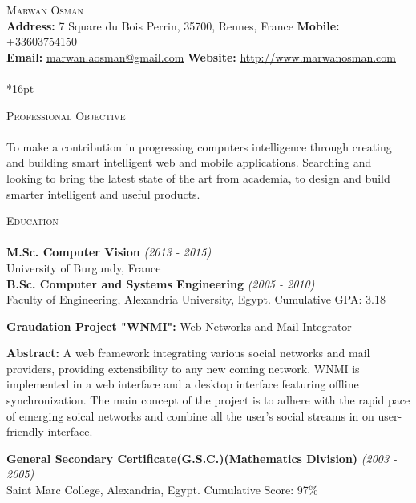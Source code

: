 \documentclass[letterpaper,12pt]{article}
\author{Marwan Osman}
\newcommand{\lineunder}{\vspace*{-8pt} \\ \hspace*{-8pt} \hrulefill \\}
\newcommand{\interval}[1]{\textit{(#1)} }
\newcommand{\header}[1]{{\hspace*{0pt}\vspace*{6pt} \textsc{#1}} \vspace*{-6pt} \lineunder}
\newcommand{\education}[3]{{\textbf{#1} \interval{#2}\\{#3}\\ }}
\newcommand{\objective}[1]{{#1\\\vspace*{8pt}}}
\newcommand{\contact}[3]{\vspace*{-8pt} {\LARGE \scshape {#1}}\\ #2 \lineunder #3 \vspace*{-8pt} }
\newenvironment{details}{\vspace*{-4pt} \begin{list}{\topsep 0pt \itemsep -2pt}}{\vspace*{4pt}\end{list}}
\begin{document}
\small
\smallskip
\vspace*{-30pt}

\contact{Marwan Osman}
{\textbf{Address:} 7 Square du Bois Perrin, 35700, Rennes, France \textbf{Mobile:} +33603754150
\\\textbf{Email:} \href{mailto:marwan.aosman@gmail.com}{marwan.aosman@gmail.com} \textbf{Website:} \url{http://www.marwanosman.com}
}

\vspace*{16pt}

\header{Professional Objective}
\objective{To make a contribution in progressing computers intelligence through creating and building smart intelligent web and mobile applications.
Searching and looking to bring the latest state of the art from academia, to design and build smarter intelligent and useful products.}

\header{Education}
\education{M.Sc. Computer Vision}{2013 - 2015}{University of Burgundy, France}
\vspace*{4pt}
\education{B.Sc. Computer and Systems Engineering}{2005 - 2010}{Faculty of Engineering, Alexandria University, Egypt. Cumulative GPA: 3.18}
  \begin{details}
    \item \textbf{Graudation Project "WNMI":} Web Networks and Mail Integrator
    \item \textbf{Abstract:} A web framework integrating various social networks and mail providers, providing extensibility to any new coming network. WNMI is implemented in a web interface and a desktop interface featuring offline synchronization. The main concept of the project is to adhere with the rapid pace of emerging soical networks and combine all the user's social streams in on user-friendly interface.
  \end{details}
\vspace*{4pt}
\education{General Secondary Certificate(G.S.C.)(Mathematics Division)}{2003 - 2005}{Saint Marc College, Alexandria, Egypt. Cumulative Score: 97\%}
\vspace*{4pt}
\end{document}
